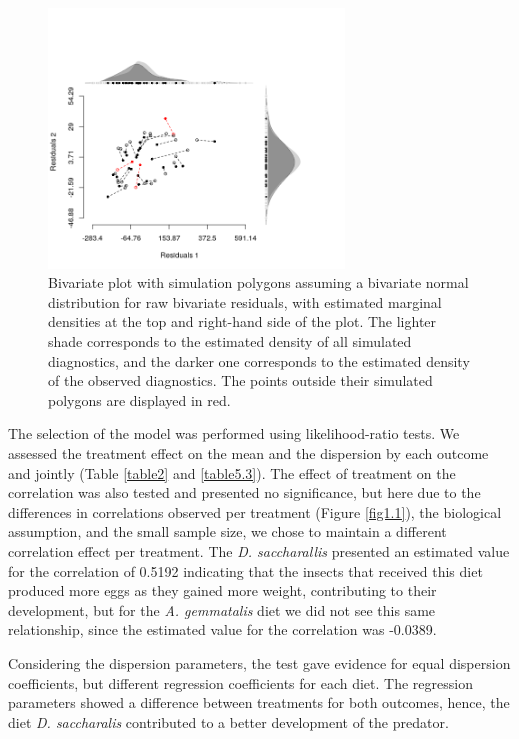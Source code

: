 \documentclass[useAMS,referee]{biom}
\begin{document}
\begin{figure}[htb]
\centering
\includegraphics[width=0.7\textwidth]{pod4}
\caption{Bivariate plot with simulation polygons assuming a bivariate normal distribution for raw bivariate residuals, with estimated marginal densities at the top and right-hand side of the plot. The lighter shade corresponds to the estimated density of all simulated diagnostics, and the darker one corresponds to the estimated density of the observed diagnostics. The points outside their simulated polygons are displayed in red.}
\label{fig1.2}
\end{figure}



The selection of the model was performed using likelihood-ratio tests. We assessed the treatment effect on the mean and the dispersion by each outcome and jointly (Table \ref{table2} and \ref{table5.3}). The effect of treatment on the correlation was also tested and presented no significance, but here due to the differences in correlations observed per treatment (Figure \ref{fig1.1}), the biological assumption, and the small sample size, we chose to maintain a different correlation effect per treatment.  The \textit{D. saccharallis} presented an estimated value for the correlation of 0.5192 indicating that the insects that received this diet produced more eggs as they gained more weight, contributing to their development, but for the
\textit{A. gemmatalis} diet we did not see this same relationship, since the estimated value for the correlation was -0.0389.

Considering the dispersion parameters, the test gave evidence for equal dispersion coefficients, but different regression coefficients for each diet. The regression parameters showed a difference between treatments for both outcomes, hence, the diet \textit{D. saccharalis} contributed to a better development of the predator.
\end{document}
